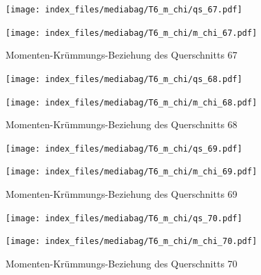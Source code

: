 \documentclass[
  11pt,
  letterpaper,
]{scrreprt}
\begin{document}
\begin{figure}[H]

\begin{minipage}{0.50\linewidth}
\texttt{[image: index\_files/mediabag/T6\_m\_chi/qs\_67.pdf]}\end{minipage}%
%
\begin{minipage}{0.50\linewidth}
\texttt{[image: index\_files/mediabag/T6\_m\_chi/m\_chi\_67.pdf]}\end{minipage}%

\caption{\label{fig-mchi_anhang}Momenten-Krümmungs-Beziehung des
Querschnitts 67}

\end{figure}%

\begin{figure}[H]

\begin{minipage}{0.50\linewidth}
\texttt{[image: index\_files/mediabag/T6\_m\_chi/qs\_68.pdf]}\end{minipage}%
%
\begin{minipage}{0.50\linewidth}
\texttt{[image: index\_files/mediabag/T6\_m\_chi/m\_chi\_68.pdf]}\end{minipage}%

\caption{\label{fig-mchi_anhang}Momenten-Krümmungs-Beziehung des
Querschnitts 68}

\end{figure}%

\begin{figure}[H]

\begin{minipage}{0.50\linewidth}
\texttt{[image: index\_files/mediabag/T6\_m\_chi/qs\_69.pdf]}\end{minipage}%
%
\begin{minipage}{0.50\linewidth}
\texttt{[image: index\_files/mediabag/T6\_m\_chi/m\_chi\_69.pdf]}\end{minipage}%

\caption{\label{fig-mchi_anhang}Momenten-Krümmungs-Beziehung des
Querschnitts 69}

\end{figure}%

\begin{figure}[H]

\begin{minipage}{0.50\linewidth}
\texttt{[image: index\_files/mediabag/T6\_m\_chi/qs\_70.pdf]}\end{minipage}%
%
\begin{minipage}{0.50\linewidth}
\texttt{[image: index\_files/mediabag/T6\_m\_chi/m\_chi\_70.pdf]}\end{minipage}%

\caption{\label{fig-mchi_anhang}Momenten-Krümmungs-Beziehung des
Querschnitts 70}

\end{figure}%
\end{document}
